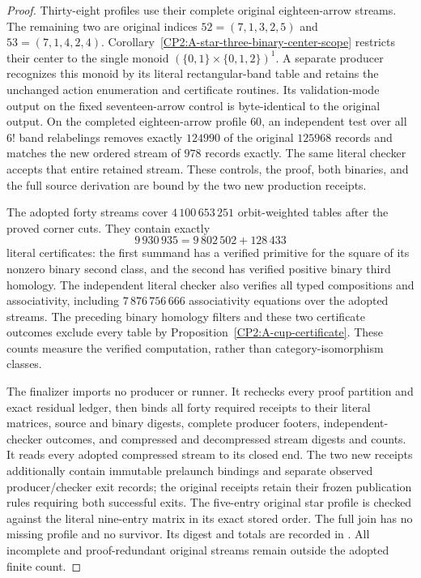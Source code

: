 \begin{proof}
Thirty-eight profiles use their complete original
eighteen-arrow streams.  The remaining two are original
indices $52=(7,1,3,2,5)$ and $53=(7,1,4,2,4)$.
Corollary~\ref{CP2:A-star-three-binary-center-scope}
restricts their center to the single monoid
$(\{0,1\}\times\{0,1,2\})^1$.  A separate producer
recognizes this monoid by its literal rectangular-band
table and retains the unchanged action enumeration and
certificate routines.  Its validation-mode output on
the fixed seventeen-arrow control is byte-identical to
the original output.  On the completed eighteen-arrow
profile $60$, an independent test over all $6!$ band
relabelings removes exactly $124990$ of the original
$125968$ records and matches the new ordered stream of
$978$ records exactly.  The same literal checker
accepts that entire retained stream.  These controls,
the proof, both binaries, and the full source derivation
are bound by the two new production receipts.

The adopted forty streams cover $4\,100\,653\,251$
orbit-weighted tables after the proved corner cuts.
They contain exactly
\[
  9\,930\,935
  =9\,802\,502+128\,433
\]
literal certificates: the first summand has a verified
primitive for the square of its nonzero binary second
class, and the second has verified positive binary
third homology.  The independent literal checker also
verifies all typed compositions and associativity,
including $7\,876\,756\,666$ associativity equations
over the adopted streams.  The preceding binary
homology filters and these two certificate outcomes
exclude every table by Proposition~\ref{CP2:A-cup-certificate}.
These counts measure the verified computation, rather
than category-isomorphism classes.

The finalizer
imports no producer or runner.  It rechecks every proof
partition and exact residual ledger, then binds all
forty required receipts to their literal matrices,
source and binary digests, complete producer footers,
independent-checker outcomes, and compressed and
decompressed stream digests and counts.  It reads every
adopted compressed stream to its closed end.  The two
new receipts additionally contain immutable prelaunch
bindings and separate observed producer/checker exit
records; the original receipts retain their frozen
publication rules requiring both successful exits.
The five-entry original star profile is checked against
the literal nine-entry matrix in its exact stored order.
The full join has no missing profile and no survivor.
Its digest and totals are recorded in
.
All incomplete and proof-redundant original streams
remain outside the adopted finite count.
\end{proof}
